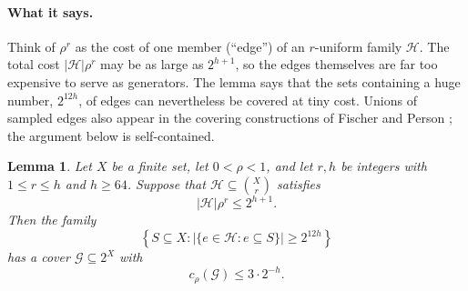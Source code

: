\documentclass[11pt,letterpaper]{article}
\newtheorem{lemma}[theorem]{Lemma}
\theoremstyle{definition}
\theoremstyle{remark}
\numberwithin{equation}{section}
\begin{document}
\paragraph{What it says.}
Think of $\rho^r$ as the cost of one member (``edge'') of an $r$-uniform
family $\mathcal H$. The total cost $|\mathcal H|\rho^r$ may be as large as
$2^{h+1}$, so the edges themselves are far too expensive to serve as
generators. The lemma says that the sets containing a huge number,
$2^{12h}$, of edges can nevertheless be covered at tiny cost.
Unions of sampled edges also appear in the covering constructions of
Fischer and Person \cite[Sections~1.1 and~2]{FischerPerson25}; the argument
below is self-contained.

\begin{lemma}\label{lem:covering}
Let \(X\) be a finite set, let \(0<\rho<1\), and let \(r,h\) be integers
with \(1\le r\le h\) and \(h\ge64\). Suppose that
\(\mathcal H\subseteq\binom{X}{r}\) satisfies
\[
|\mathcal H|\rho^r\le2^{h+1}.
\]
Then the family
\[
\left\{S\subseteq X:
  |\{e\in\mathcal H:e\subseteq S\}|\ge2^{12h}\right\}
\]
has a cover \(\mathcal G\subseteq2^X\) with
\[
c_\rho(\mathcal G)\le3\cdot2^{-h}.
\]
\end{lemma}
\end{document}
